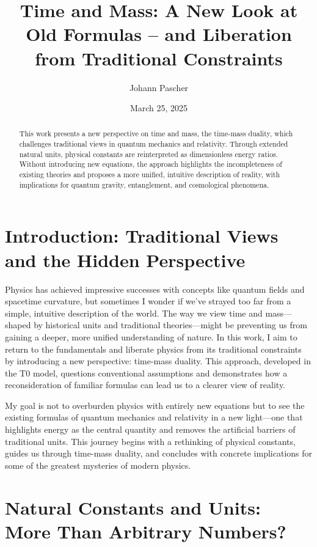 \documentclass[a4paper,12pt]{article}
\title{Time and Mass: A New Look at Old Formulas – and Liberation from Traditional Constraints}
\author{Johann Pascher}
\date{March 25, 2025}
\begin{document}
	
	\maketitle
	
	\begin{abstract}
		This work presents a new perspective on time and mass, the time-mass duality, which challenges traditional views in quantum mechanics and relativity. Through extended natural units, physical constants are reinterpreted as dimensionless energy ratios. Without introducing new equations, the approach highlights the incompleteness of existing theories and proposes a more unified, intuitive description of reality, with implications for quantum gravity, entanglement, and cosmological phenomena.
	\end{abstract}
	
	\tableofcontents
	\newpage
	
	\section{Introduction: Traditional Views and the Hidden Perspective}
	
	Physics has achieved impressive successes with concepts like quantum fields and spacetime curvature, but sometimes I wonder if we’ve strayed too far from a simple, intuitive description of the world. The way we view time and mass—shaped by historical units and traditional theories—might be preventing us from gaining a deeper, more unified understanding of nature. In this work, I aim to return to the fundamentals and liberate physics from its traditional constraints by introducing a new perspective: time-mass duality. This approach, developed in the T0 model, questions conventional assumptions and demonstrates how a reconsideration of familiar formulas can lead us to a clearer view of reality.
	
	My goal is not to overburden physics with entirely new equations but to see the existing formulas of quantum mechanics and relativity in a new light—one that highlights energy as the central quantity and removes the artificial barriers of traditional units. This journey begins with a rethinking of physical constants, guides us through time-mass duality, and concludes with concrete implications for some of the greatest mysteries of modern physics.
	
	\section{Natural Constants and Units: More Than Arbitrary Numbers?}
	
\end{document}
